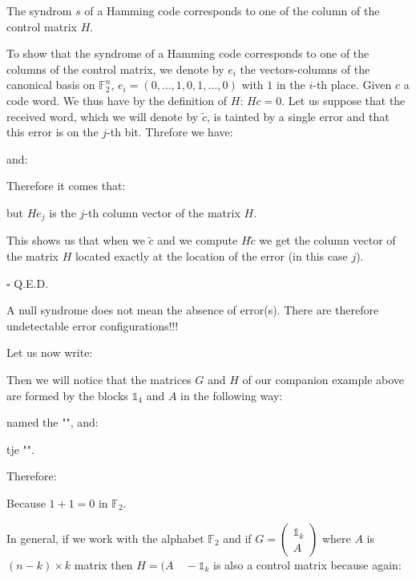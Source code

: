 	\begin{theorem}
	The syndrom $s$ of a Hamming code corresponds to one of the column of the control matrix $H$.
	\end{theorem}
	\begin{dem}
	To show that the syndrome of a Hamming code corresponds to one of the columns of the control matrix, we denote by $e_i$ the vectors-columns of the canonical basis on $\mathbb{F}_2^n$, $e_i=(0,\ldots,1,0,1,\ldots,0)$ with $1$ in the $i$-th place. Given $c$ a code word. We thus have by the definition of $H$: $Hc=0$. Let us suppose that the received word, which we will denote by $\tilde{c}$, is tainted by a single error and that this error is on the $j$-th bit. Threfore we have:
	
	and:
	
	Therefore it comes that:
	
	but $He_j$ is the $j$-th column vector of the matrix $H$.
	
	This shows us that when we $\tilde{c}$ and we compute $H\tilde{c}$ we get the column vector of the matrix $H$ located exactly at the location of the error (in this case $j$).
	\begin{flushright}
		$\square$  Q.E.D.
	\end{flushright}
	\end{dem}
	\begin{tcolorbox}[title=Remark,colframe=black,arc=10pt]
	A null syndrome does not mean the absence of error(s). There are therefore undetectable error configurations!!!
	\end{tcolorbox}
	Let us now write:
	
	Then we will notice that the matrices $G$ and $H$ of our companion example above are formed by the blocks $\mathds{1}_4$ and $A$ in the following way:
	
	named the "", and:
	
	tje "".
	
	Therefore:
	
	Because $1 + 1 = 0$ in $\mathbb{F}_2$.

	In general, if we work with the alphabet $\mathbb{F}_2$ and if $G=\begin{pmatrix}\mathds{1}_k\\ A\end{pmatrix}$ where $A$ is $(n-k)\times k$ matrix then $H=(A\quad -\mathds{1}_k$ is also a control matrix because again:
	
